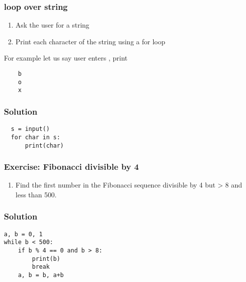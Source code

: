 \documentclass[14pt,compress]{beamer}
\begin{document}
\begin{frame}
  \frametitle{ loop over string}
  \begin{enumerate}
  \item Ask the user for a string
  \item Print each character of the string using a for loop
  \end{enumerate}
  For example let us say user enters , print
  \begin{lstlisting}
    b
    o
    x
  \end{lstlisting}
\end{frame}

\begin{frame}
\frametitle{Solution}
\begin{lstlisting}
  s = input()
  for char in s:
      print(char)
\end{lstlisting}
\end{frame}

\begin{frame}
  \frametitle{Exercise: Fibonacci divisible by 4}
  \begin{enumerate}
  \item Find the first number in the Fibonacci sequence divisible by 4 but > 8
    and less than 500.
  \end{enumerate}
\end{frame}

\begin{frame}
\frametitle{Solution}
\begin{lstlisting}
a, b = 0, 1
while b < 500:
    if b % 4 == 0 and b > 8:
        print(b)
        break
    a, b = b, a+b
\end{lstlisting}
\end{frame}
\end{document}
